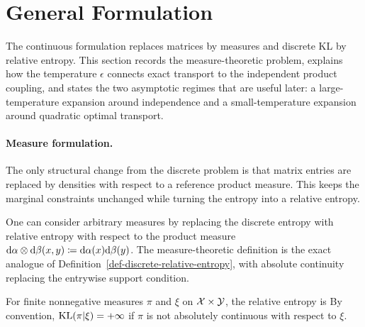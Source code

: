 \section{General Formulation}

The continuous formulation replaces matrices by measures and discrete KL by relative entropy. This section records the measure-theoretic problem, explains how the temperature $\epsilon$ connects exact transport to the independent product coupling, and states the two asymptotic regimes that are useful later: a large-temperature expansion around independence and a small-temperature expansion around quadratic optimal transport.

\paragraph{Measure formulation.}

The only structural change from the discrete problem is that matrix entries are replaced by densities with respect to a reference product measure. This keeps the marginal constraints unchanged while turning the entropy into a relative entropy.

One can consider arbitrary measures by replacing the discrete entropy with relative entropy with respect to the product measure $\mathrm{d}\alpha\otimes\mathrm{d}\beta(x,y) \coloneqq \mathrm{d}\alpha(x)\mathrm{d}\beta(y)$.
The measure-theoretic definition is the exact analogue of Definition~\ref{def-discrete-relative-entropy}, with absolute continuity replacing the entrywise support condition.

\begin{defn}\label{def-measure-relative-entropy}
	For finite nonnegative measures $\pi$ and $\xi$ on $\mathcal{X}\times\mathcal{Y}$, the relative entropy is
		By convention, $\operatorname{KL}(\pi|\xi)=+\infty$ if $\pi$ is not absolutely continuous with respect to $\xi$.
\end{defn}

